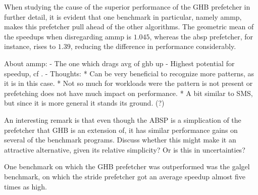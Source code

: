 
When studying the cause of the superior performance of the GHB
prefetcher in further detail, it is evident that one benchmark in
particular, namely ammp, makes this prefetcher pull ahead of the other
algorithms. The geometric mean of the speedups when disregarding ammp
is $1.045$, whereas the absp prefetcher, for instance, rises to
$1.39$, reducing the difference in performance considerably.

About ammp:
- The one which drags avg of ghb up
- Highest potential for speedup, cf \cite{Nesbit}.
- Thoughts:
  * Can be very beneficial to recognize more patterns, as it is in this case.
  * Not so much for workloads were the pattern is not present or
    prefetching does not have much impact on performance.
  * A bit similar to SMS, but since it is more general it stands its ground. (?)


An interesting remark is that even though the ABSP is a simplication
of the prefetcher that GHB is an extension of, it has similar
performance gains on several of the benchmark programs. Discuss
whether this might make it an attractive alternative, given its
relative simplicity? Or is this in uncertainties?

One benchmark on which the GHB prefetcher was outperformed was the
galgel benchmark, on which the stride prefetcher got an average
speedup almost five times as high.




